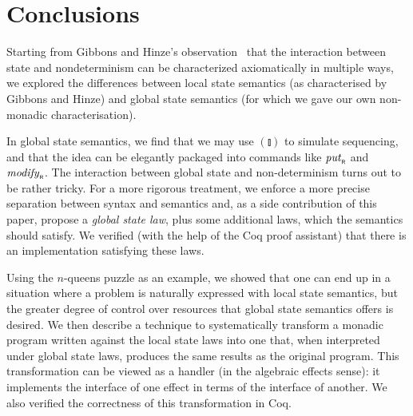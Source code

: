 \documentclass{llncs}
\newcommand{\Varid}[1]{\mathit{#1}}
\let\Varid\mathit
\begin{document}
\section{Conclusions}
\label{sec:conclusion}

Starting from Gibbons and Hinze's observation~\cite{GibbonsHinze:11:Just}
that the interaction between state and nondeterminism can be characterized
axiomatically in
multiple ways, we explored the differences between local state semantics (as
characterised by Gibbons and Hinze) and global state semantics (for which we
gave our own non-monadic characterisation).

In global state semantics, we find that we may use \ensuremath{(\talloblong)} to simulate sequencing, and that the idea can be elegantly packaged into commands like \ensuremath{\Varid{put}_{\scaleobj{0.7}{\sf R}}} and \ensuremath{\Varid{modify}_{\scaleobj{0.7}{\sf R}}}.
The interaction between global state and non-determinism turns out to be rather tricky.
For a more rigorous treatment, we enforce a more precise separation between
syntax and semantics and, as a side contribution of this paper, propose a
\emph{global state law}, plus some additional laws, which the semantics should satisfy.
We verified (with the help of the Coq proof assistant) that there is an implementation satisfying these laws.

Using the $n$-queens puzzle as an example, we showed that one can end up in a
situation where a problem is naturally expressed with local state semantics, but
the greater degree of control over resources that global state semantics offers
is desired. We then describe a technique to systematically transform a
monadic program written against the local state laws into one that,
when interpreted under global state laws, produces the same results as the
original program. This transformation can be viewed as a handler (in the
algebraic effects sense): it implements the interface of one effect in terms of
the interface of another.
We also verified the correctness of this transformation in Coq.
\end{document}
